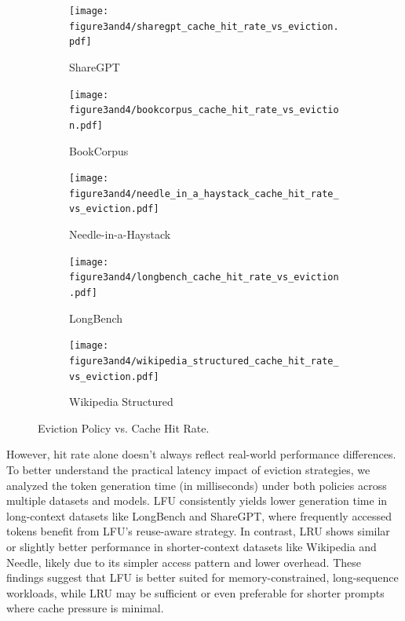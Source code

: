 \documentclass[sigconf,nonacm]{acmart}
\begin{document}
\begin{figure}[htbp]
    \centering

    \begin{subfigure}[b]{0.47\columnwidth}
        \texttt{[image: figure3and4/sharegpt\_cache\_hit\_rate\_vs\_eviction.pdf]}
        \caption{ShareGPT}
    \end{subfigure}
    \hfill
    \begin{subfigure}[b]{0.47\columnwidth}
        \texttt{[image: figure3and4/bookcorpus\_cache\_hit\_rate\_vs\_eviction.pdf]}
        \caption{BookCorpus}
    \end{subfigure}

    

    \begin{subfigure}[b]{0.47\columnwidth}
        \texttt{[image: figure3and4/needle\_in\_a\_haystack\_cache\_hit\_rate\_vs\_eviction.pdf]}
        \caption{Needle-in-a-Haystack}
    \end{subfigure}
    \hfill
    \begin{subfigure}[b]{0.47\columnwidth}
        \texttt{[image: figure3and4/longbench\_cache\_hit\_rate\_vs\_eviction.pdf]}
        \caption{LongBench}
    \end{subfigure}

    \vspace{0.5em}

    \begin{subfigure}[b]{0.47\columnwidth}
        \texttt{[image: figure3and4/wikipedia\_structured\_cache\_hit\_rate\_vs\_eviction.pdf]}
        \caption{Wikipedia Structured}
    \end{subfigure}

    \caption{Eviction Policy vs. Cache Hit Rate.}
    \label{fig:3}
\end{figure}\par However, hit rate alone doesn't always reflect real-world performance differences. To better understand the practical latency impact of eviction strategies, we analyzed the token generation time (in milliseconds) under both policies across multiple datasets and models. LFU consistently yields lower generation time in long-context datasets like LongBench and ShareGPT, where frequently accessed tokens benefit from LFU’s reuse-aware strategy. In contrast, LRU shows similar or slightly better performance in shorter-context datasets like Wikipedia and Needle, likely due to its simpler access pattern and lower overhead. These findings suggest that LFU is better suited for memory-constrained, long-sequence workloads, while LRU may be sufficient or even preferable for shorter prompts where cache pressure is minimal.
\end{document}
